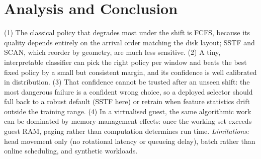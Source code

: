 \documentclass[10pt,a4paper]{article}
\begin{document}
\section{Analysis and Conclusion}
(1) The classical policy that degrades most under the shift is FCFS, because its quality depends
entirely on the arrival order matching the disk layout; SSTF and SCAN, which reorder by
geometry, are much less sensitive. (2) A tiny, interpretable classifier can pick the right
policy per window and beats the best fixed policy by a small but consistent margin, and its
confidence is well calibrated in distribution. (3) That confidence cannot be trusted after an
unseen shift: the most dangerous failure is a confident wrong choice, so a deployed selector
should fall back to a robust default (SSTF here) or retrain when feature statistics drift
outside the training range. (4) In a virtualised guest, the same algorithmic work can be
dominated by memory-management effects: once the working set exceeds guest RAM, paging rather
than computation determines run time. \emph{Limitations:} head movement only (no rotational
latency or queueing delay), batch rather than online scheduling, and synthetic workloads.

\small

\end{document}
